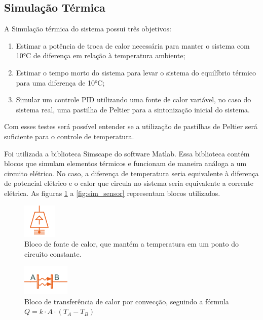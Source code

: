 \subsection{Simulação Térmica}

A Simulação térmica do sistema possui três objetivos:

\begin{enumerate}
    \item Estimar a potência de troca de calor necessária para manter o sistema com 10°C de diferença em relação à temperatura ambiente;
    \item Estimar o tempo morto do sistema para levar o sistema do equilíbrio térmico para uma diferença de 10°C;
    \item Simular um controle PID utilizando uma fonte de calor variável, no caso do sistema real, uma pastilha de Peltier para a sintonização inicial do sistema.
\end{enumerate}

Com esses testes será possível entender se a utilização de pastilhas de Peltier será suficiente para o controle de temperatura.


Foi utilizada a biblioteca Simscape do software Matlab. Essa biblioteca contém blocos que simulam elementos térmicos e funcionam de maneira análoga a um circuito elétrico. No caso, a diferença de temperatura seria equivalente à diferença de potencial elétrico e o calor que circula no sistema seria equivalente a corrente elétrica. As figuras \ref{fig:sim_fonte_calor} a \ref{fig:sim_sensor} representam blocos utilizados.


\begin{figure}[H]
    \centering
    \includegraphics[scale=1.0]{figuras/projeto/controle/fonte_calor.png}
    \caption{Bloco de fonte de calor, que mantém a temperatura em um ponto do circuito constante.}
    \label{fig:sim_fonte_calor}
\end{figure}

\begin{figure}[H]
    \centering
    \includegraphics[scale=1.0]{figuras/projeto/controle/conveccao.png}
    \caption{Bloco de transferência de calor por convecção, seguindo a fórmula \(Q = k \cdot A \cdot (T_A - T_B) \)}
    \label{fig:sim_conveccao}
\end{figure}

